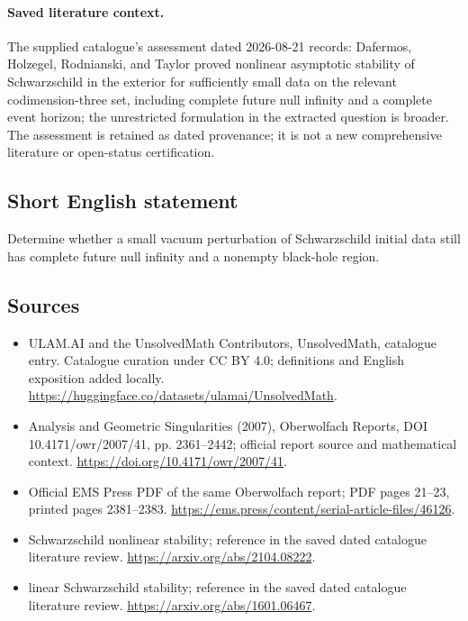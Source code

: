 \documentclass[11pt]{article}
\begin{document}
\paragraph{Saved literature context.} The supplied catalogue's assessment dated 2026-08-21 records: Dafermos, Holzegel, Rodnianski, and Taylor proved nonlinear asymptotic stability of Schwarzschild in the exterior for sufficiently small data on the relevant codimension-three set, including complete future null infinity and a complete event horizon; the unrestricted formulation in the extracted question is broader. The assessment is retained as dated provenance; it is not a new comprehensive literature or open-status certification.
\subsection{Short English statement}
Determine whether a small vacuum perturbation of Schwarzschild initial data still has complete future null infinity and a nonempty black-hole region.
\subsection{Sources}
\begin{itemize}
\item[\hypertarget{source:statement:1}{S1}] ULAM.AI and the UnsolvedMath Contributors, UnsolvedMath, catalogue entry. Catalogue curation under CC BY 4.0; definitions and English exposition added locally.
\url{https://huggingface.co/datasets/ulamai/UnsolvedMath}.
\item[\hypertarget{source:statement:2}{S2}] Analysis and Geometric Singularities (2007), Oberwolfach Reports, DOI 10.4171/owr/2007/41, pp. 2361--2442; official report source and mathematical context.
\url{https://doi.org/10.4171/owr/2007/41}.
\item[\hypertarget{source:statement:3}{S3}] Official EMS Press PDF of the same Oberwolfach report; PDF pages 21--23, printed pages 2381--2383.
\url{https://ems.press/content/serial-article-files/46126}.
\item[\hypertarget{source:statement:4}{S4}] Schwarzschild nonlinear stability; reference in the saved dated catalogue literature review.
\url{https://arxiv.org/abs/2104.08222}.
\item[\hypertarget{source:statement:5}{S5}] linear Schwarzschild stability; reference in the saved dated catalogue literature review.
\url{https://arxiv.org/abs/1601.06467}.
\end{itemize}
\label{end:statement}
\end{document}
